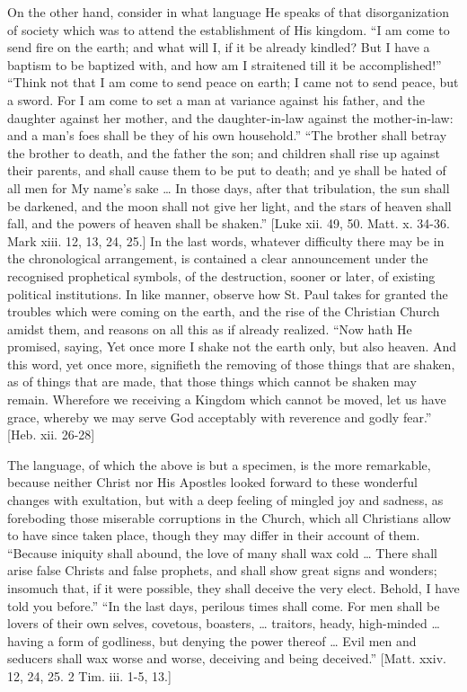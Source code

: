 On the other hand, consider in what language He speaks of that
disorganization of society which was to attend the establishment of His
kingdom. ``I am come to send fire on the earth; and what will I, if
it be already kindled? But I have a baptism to be baptized with, and how
am I straitened till it be accomplished!'' ``Think not that I am
come to send peace on earth; I came not to send peace, but a sword. For
I am come to set a man at variance against his father, and the daughter
against her mother, and the daughter-in-law against the mother-in-law:
and a man's foes shall be they of his own household.'' ``The
brother shall betray the brother to death, and the father the son; and
children shall rise up against their parents, and shall cause them to be
put to death; and ye shall be hated of all men for My name's sake … In
those days, after that tribulation, the sun shall be darkened, and the
moon shall not give her light, and the stars of heaven shall fall, and
the powers of heaven shall be shaken.'' [Luke xii. 49, 50. Matt. x.
34-36. Mark xiii. 12, 13, 24, 25.] In the last words, whatever
difficulty there may be in the chronological arrangement, is contained a
clear announcement under the recognised prophetical symbols, of the
destruction, sooner or later, of existing political institutions. In
like manner, observe how St. Paul takes for granted the troubles which
were coming on the earth, and the rise of the Christian Church amidst
them, and reasons on all this as if already realized. ``Now hath He
promised, saying, Yet once more I shake not the earth only, but also
heaven. And this word, yet once more, signifieth the removing of those
things that are shaken, as of things that are made, that those things
which cannot be shaken may remain. Wherefore we receiving a Kingdom
which cannot be moved, let us have grace, whereby we may serve God
acceptably with reverence and godly fear.'' [Heb. xii. 26-28]

The language, of which the above is but a specimen, is the more
remarkable, because neither Christ nor His Apostles looked forward to
these wonderful changes with exultation, but with a deep feeling of
mingled joy and sadness, as foreboding those miserable corruptions in
the Church, which all Christians allow to have since taken place, though
they may differ in their account of them. ``Because iniquity shall
abound, the love of many shall wax cold … There shall arise false
Christs and false prophets, and shall show great signs and wonders;
insomuch that, if it were possible, they shall deceive the very elect.
Behold, I have told you before.'' ``In the last days, perilous
times shall come. For men shall be lovers of their own selves, covetous,
boasters, … traitors, heady, high-minded … having a form of
godliness, but denying the power thereof … Evil men and seducers shall
wax worse and worse, deceiving and being deceived.'' [Matt. xxiv.
12, 24, 25. 2 Tim. iii. 1-5, 13.]

